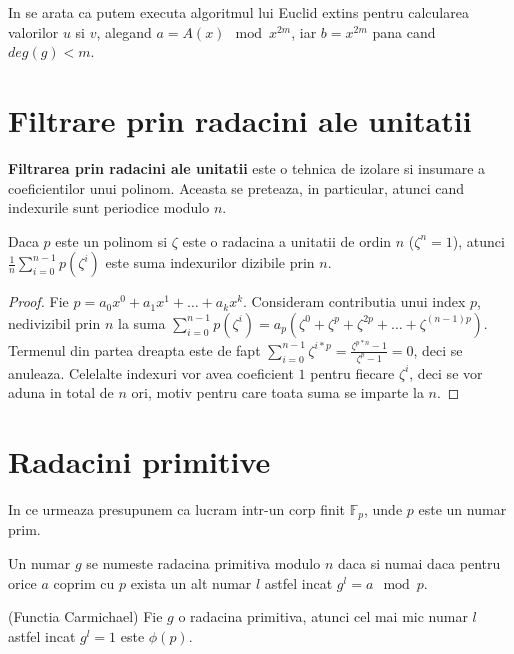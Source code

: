 In \cite{sugiyama} se arata ca putem executa algoritmul lui Euclid extins pentru
calcularea valorilor $u$ si $v$, alegand $a = A(x) \mod x^{2m}$, iar
$b = x^{2m}$ pana cand $deg(g) < m$.

\pagebreak

\section{Filtrare prin radacini ale unitatii}

\label{rootsofunityfilter}

\textbf{Filtrarea prin radacini ale unitatii} este o tehnica de izolare si
insumare a coeficientilor unui polinom. Aceasta se preteaza, in particular,
atunci cand indexurile sunt periodice modulo $n$.

\begin{thm}
  Daca $p$ este un polinom si $\zeta$ este o radacina a unitatii de ordin
  $n$ ($\zeta^{n} = 1$), atunci $\frac{1}{n} \sum_{i=0}^{n-1} p(\zeta^{i})$
  este suma indexurilor dizibile prin $n$.
\end{thm}

\begin{proof}
  Fie $p = a_{0}x^{0} + a_{1}x^{1} + \ldots + a_{k}x^{k}$. Consideram contributia
  unui index $p$, nedivizibil prin $n$ la suma
  $\sum_{i=0}^{n-1} p(\zeta^{i}) = a_{p}(\zeta^{0} + \zeta^{p} + \zeta^{2p} + \ldots + \zeta^{(n-1)p})$.
  Termenul din partea dreapta este de fapt $\sum_{i=0}^{n-1} \zeta^{i*p} = \frac{\zeta^{p*n} - 1}{\zeta^{p} - 1} = 0$,
  deci se anuleaza. Celelalte indexuri vor avea coeficient $1$ pentru fiecare
  $\zeta^{i}$, deci se vor aduna in total de $n$ ori, motiv pentru care toata suma
  se imparte la $n$.
\end{proof}


\pagebreak

\section{Radacini primitive}

In ce urmeaza presupunem ca lucram intr-un corp finit $\mathbb{F}_{p}$, unde $p$ este un numar prim.

\begin{defn}
  Un numar $g$ se numeste radacina primitiva modulo $n$ daca si numai daca pentru orice $a$ coprim cu $p$ exista un alt numar
  $l$ astfel incat $g^{l} = a \mod p$.
\end{defn}

\begin{thm}
  \label{carmichael}
  (Functia Carmichael) Fie $g$ o radacina primitiva, atunci cel mai mic numar $l$ astfel incat $g^{l} = 1$ este $\phi(p)$.
\end{thm}

